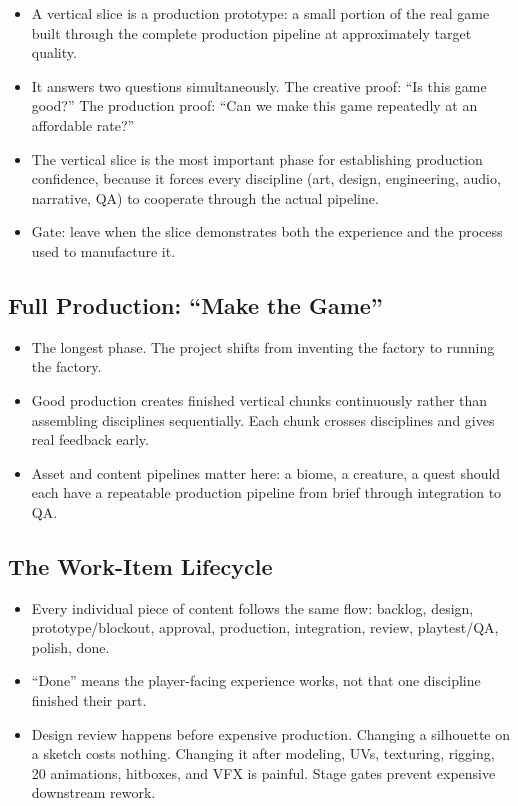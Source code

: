 \documentclass[
  11pt,
  letterpaper,
  DIV=11,
  numbers=noendperiod,
  twoside,
  open=right]{scrreprt}
\providecommand{\tightlist}{%
  \setlength{\itemsep}{0pt}\setlength{\parskip}{0pt}}
\begin{document}
\begin{itemize}
\tightlist
\item
  A vertical slice is a production prototype: a small portion of the
  real game built through the complete production pipeline at
  approximately target quality.
\item
  It answers two questions simultaneously. The creative proof: ``Is this
  game good?'' The production proof: ``Can we make this game repeatedly
  at an affordable rate?''
\item
  The vertical slice is the most important phase for establishing
  production confidence, because it forces every discipline (art,
  design, engineering, audio, narrative, QA) to cooperate through the
  actual pipeline.
\item
  Gate: leave when the slice demonstrates both the experience and the
  process used to manufacture it.
\end{itemize}

\subsection{Full Production: ``Make the
Game''}\label{full-production-make-the-game}

\begin{itemize}
\tightlist
\item
  The longest phase. The project shifts from inventing the factory to
  running the factory.
\item
  Good production creates finished vertical chunks continuously rather
  than assembling disciplines sequentially. Each chunk crosses
  disciplines and gives real feedback early.
\item
  Asset and content pipelines matter here: a biome, a creature, a quest
  should each have a repeatable production pipeline from brief through
  integration to QA.
\end{itemize}

\subsection{The Work-Item Lifecycle}\label{the-work-item-lifecycle}

\begin{itemize}
\tightlist
\item
  Every individual piece of content follows the same flow: backlog,
  design, prototype/blockout, approval, production, integration, review,
  playtest/QA, polish, done.
\item
  ``Done'' means the player-facing experience works, not that one
  discipline finished their part.
\item
  Design review happens before expensive production. Changing a
  silhouette on a sketch costs nothing. Changing it after modeling, UVs,
  texturing, rigging, 20 animations, hitboxes, and VFX is painful. Stage
  gates prevent expensive downstream rework.
\end{itemize}
\end{document}
